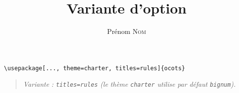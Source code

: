\documentclass[11pt]{ocots-book}
\title{Variante d'option}
\author{Prénom \textsc{Nom}}
\newcommand{\ocotsvariantnote}[1]{\begin{quote}\itshape Variante : #1\end{quote}}
\begin{document}
\maketitle

\begin{lstlisting}
\usepackage[..., theme=charter, titles=rules]{ocots}
\end{lstlisting}
\ocotsvariantnote{\texttt{titles=rules} (le th\`eme \texttt{charter} utilise par d\'efaut \texttt{bignum}).}

\end{document}

